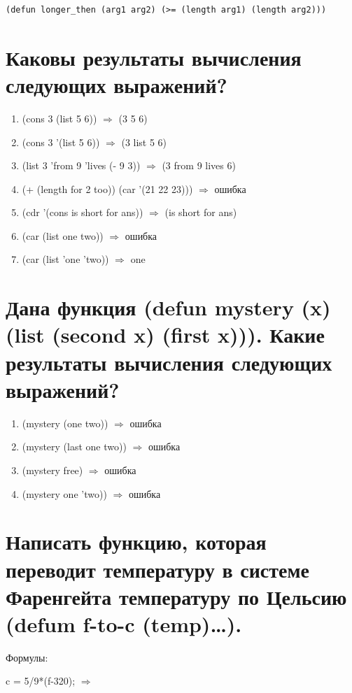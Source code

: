 \begin{lstlisting}[label=lst:task_5, caption=Задание 5.]
	(defun longer_then (arg1 arg2) (>= (length arg1) (length arg2)))
\end{lstlisting}

\section{Каковы результаты вычисления следующих выражений?}

\begin{enumerate}
	\item (cons 3 (list 5 6)) $\Rightarrow$ (3 5 6)
	\item (cons 3 '(list 5 6)) $\Rightarrow$ (3 list 5 6)
	\item (list 3 'from 9 'lives (- 9 3)) $\Rightarrow$ (3 from 9 lives 6)
	\item (+ (length for 2 too)) (car '(21 22 23))) $\Rightarrow$ ошибка 
	\item (cdr '(cons is short for ans)) $\Rightarrow$ (is short for ans)
	\item (car (list one two)) $\Rightarrow$ ошибка
	\item (car (list 'one 'two)) $\Rightarrow$ one
\end{enumerate}

\newpage
\section{Дана функция (defun mystery (x) (list (second x) (first x))). Какие результаты вычисления следующих выражений?}
\begin{enumerate}
	\item (mystery (one two)) $\Rightarrow$ ошибка
	\item (mystery (last one two)) $\Rightarrow$ ошибка
	\item (mystery free) $\Rightarrow$ ошибка
	\item (mystery one 'two)) $\Rightarrow$ ошибка
\end{enumerate}

\section{Написать функцию, которая переводит температуру в системе Фаренгейта температуру по Цельсию (defum f-to-c (temp)…).}

Формулы:

c = 5/9*(f-320); $\Rightarrow$ 

